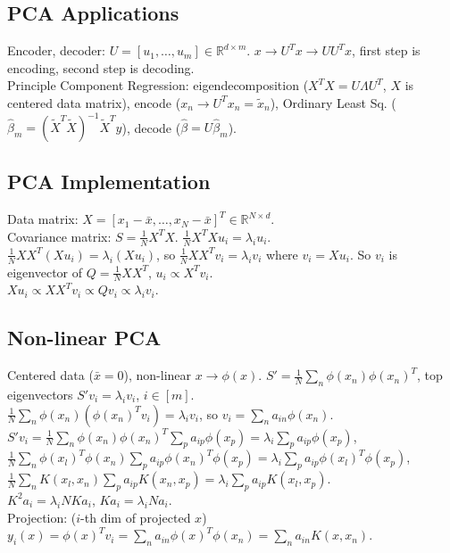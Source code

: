 \subsection*{PCA Applications}

Encoder, decoder: $U = [u_1, \dots, u_m] \in \mathbb{R}^{d \times m}$. $x \rightarrow U^T x \rightarrow UU^T x$, first step is encoding, second step is decoding.\\
Principle Component Regression: eigendecomposition ($X^T X = U \Lambda U^T$, $X$ is centered data matrix), encode ($x_n \rightarrow U^T x_n = \tilde{x}_n$), Ordinary Least Sq. ($\hat{\beta}_m = (\tilde{X}^T\tilde{X})^{-1}\tilde{X}^Ty$), decode ($\hat{\beta} = U \hat{\beta}_m$).

\subsection*{PCA Implementation}

Data matrix: $X = [x_1 - \bar{x}, \dots, x_N - \bar{x}]^T \in \mathbb{R}^{N \times d}$.\\
Covariance matrix: $S = \frac{1}{N}X^TX$. $\frac{1}{N}X^TXu_i = \lambda_i u_i$.\\
$\frac{1}{N}XX^T(Xu_i) = \lambda_i (Xu_i)$, so $\frac{1}{N}XX^T v_i = \lambda_i v_i$ where $v_i = X u_i$. So $v_i$ is eigenvector of $Q = \frac{1}{N}XX^T$, $u_i \propto X^T v_i$.\\
$Xu_i \propto XX^T v_i \propto Qv_i \propto \lambda_i v_i$.

\subsection*{Non-linear PCA}

Centered data ($\bar{x} = 0$), non-linear $x \rightarrow \phi(x)$. $S' = \frac{1}{N}\sum_n \phi(x_n) \phi(x_n)^T$, top eigenvectors $S'v_i = \lambda_i v_i$, $i \in [m]$.\\
$\frac{1}{N}\sum_n \phi(x_n)(\phi(x_n)^T v_i) = \lambda_i v_i$, so $v_i = \sum_n a_{in}\phi(x_n)$.\\
$S' v_i = \frac{1}{N}\sum_n \phi(x_n)\phi(x_n)^T \sum_p a_{ip}\phi(x_p) = \lambda_i \sum_p a_{ip}\phi(x_p)$, $\frac{1}{N}\sum_n \phi(x_l)^T \phi(x_n) \sum_p a_{ip}\phi(x_n)^T \phi(x_p) = \lambda_i \sum_p a_{ip}\phi(x_l)^T \phi(x_p)$, $\frac{1}{N}\sum_n K(x_l, x_n) \sum_p a_{ip}K(x_n, x_p) = \lambda_i \sum_p a_{ip}K(x_l, x_p)$.\\
$K^2 a_i = \lambda_i NKa_i$, $Ka_i = \lambda_i Na_i$.\\
Projection: ($i$-th dim of projected $x$) $y_i(x) = \phi(x)^T v_i = \sum_n a_{in}\phi(x)^T\phi(x_n) = \sum_n a_{in} K(x, x_n)$.

